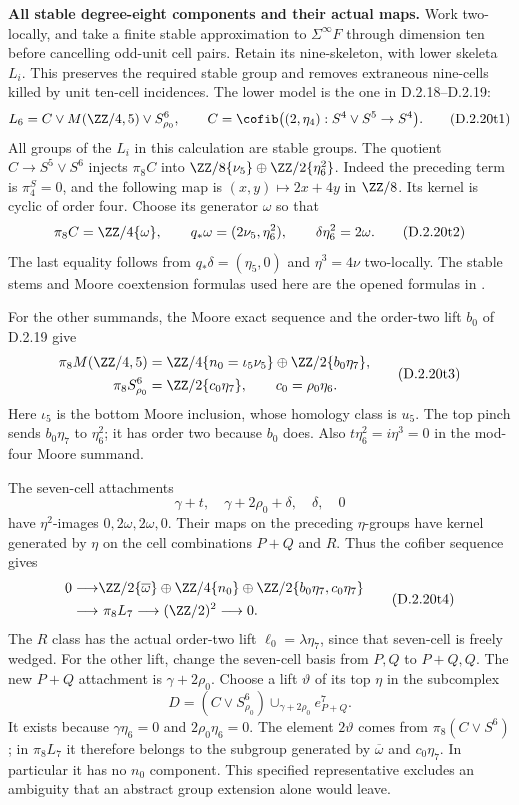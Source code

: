 \medskip\noindent
\textbf{All stable degree-eight components and their actual maps.}
Work two-locally, and take a finite stable approximation to
$\Sigma^\infty F$ through dimension ten before cancelling odd-unit
cell pairs. Retain its nine-skeleton, with lower skeleta $L_i$.
This preserves the required stable group and removes extraneous
nine-cells killed by unit ten-cell incidences. The lower model is
the one in D.2.18--D.2.19:
\[
 L_6=C\vee M(\ZZ/4,5)\vee S^6_{\rho_0},
 \qquad
 C=\cofib\bigl((2,\eta_4):S^4\vee S^5\to S^4\bigr).
 \tag{D.2.20t1}
\]
All groups of the $L_i$ in this calculation are stable groups.
The quotient $C\to S^5\vee S^6$ injects $\pi_8C$ into
$\ZZ/8\{\nu_5\}\oplus\ZZ/2\{\eta_6^2\}$.
Indeed the preceding term is $\pi_4^S=0$, and the following
map is $(x,y)\mapsto2x+4y$ in $\ZZ/8$.
Its kernel is cyclic of order four. Choose its generator $\omega$
so that
\[
 \pi_8C=\ZZ/4\{\omega\},\qquad
 q_*\omega=(2\nu_5,\eta_6^2),\qquad
 \delta\eta_6^2=2\omega.
 \tag{D.2.20t2}
\]
The last equality follows from $q_*\delta=(\eta_5,0)$ and
$\eta^3=4\nu$ two-locally. The stable stems and Moore
coextension formulas used here are the opened formulas in
\cite[\S2, (2.1)--(2.2), p.~149]{I_Oka1986}.

For the other summands, the Moore exact sequence and the
order-two lift $b_0$ of D.2.19 give
\[
\begin{split}
 \pi_8M(\ZZ/4,5)
   &=\ZZ/4\{n_0=\iota_5\nu_5\}
       \oplus\ZZ/2\{b_0\eta_7\},\\
 \pi_8S^6_{\rho_0}&=\ZZ/2\{c_0\eta_7\},
       \qquad c_0=\rho_0\eta_6.
\end{split}
 \tag{D.2.20t3}
\]
Here $\iota_5$ is the bottom Moore inclusion, whose
homology class is $u_5$.
The top pinch sends $b_0\eta_7$ to $\eta_6^2$;
it has order two because $b_0$ does.
Also $t\eta_6^2=i\eta^3=0$ in the mod-four Moore summand.

The seven-cell attachments
\[
 \gamma+t,\quad \gamma+2\rho_0+\delta,\quad\delta,\quad0
\]
have $\eta^2$-images $0,2\omega,2\omega,0$.
Their maps on the preceding $\eta$-groups have kernel
generated by $\eta$ on the cell combinations $P+Q$ and $R$.
Thus the cofiber sequence gives
\[
\begin{split}
 0\longrightarrow&
 \ZZ/2\{\overline\omega\}\oplus\ZZ/4\{n_0\}
 \oplus\ZZ/2\{b_0\eta_7,c_0\eta_7\}\\
 \longrightarrow&\ \pi_8L_7
 \longrightarrow (\ZZ/2)^2\longrightarrow0.
\end{split}
 \tag{D.2.20t4}
\]
The $R$ class has the actual order-two lift
$\ell_0=\lambda\eta_7$, since that seven-cell is freely wedged.
For the other lift, change the seven-cell basis from $P,Q$ to
$P+Q,Q$. The new $P+Q$ attachment is $\gamma+2\rho_0$.
Choose a lift $\vartheta$ of its top $\eta$ in the subcomplex
\[
 D=(C\vee S^6_{\rho_0})
          \mathop{\cup}_{\gamma+2\rho_0}e^7_{P+Q}.
 \tag{D.2.20t5}
\]
It exists because $\gamma\eta_6=0$ and $2\rho_0\eta_6=0$.
The element $2\vartheta$ comes from $\pi_8(C\vee S^6)$;
in $\pi_8L_7$ it therefore belongs to the subgroup generated
by $\overline\omega$ and $c_0\eta_7$. In particular it has
no $n_0$ component. This specified representative excludes
an ambiguity that an abstract group extension alone would leave.

